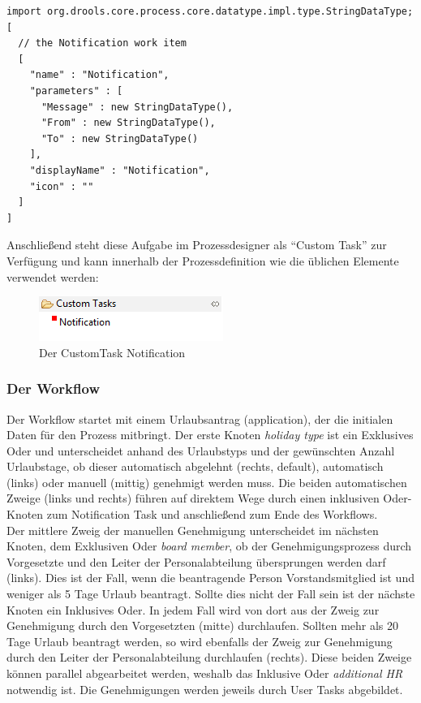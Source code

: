 \begin{lstlisting}
import org.drools.core.process.core.datatype.impl.type.StringDataType;
[
  // the Notification work item
  [
    "name" : "Notification",
    "parameters" : [
      "Message" : new StringDataType(),
      "From" : new StringDataType(),
      "To" : new StringDataType()
    ],
    "displayName" : "Notification",
    "icon" : ""
  ]
]
\end{lstlisting}

Anschließend steht diese Aufgabe im Prozessdesigner als "`Custom Task"' zur Verfügung und kann innerhalb der Prozessdefinition wie die üblichen Elemente verwendet werden:

\begin{figure}[H]
\centering
\includegraphics[width=0.4\linewidth]{Bilder/NotificationCustomTask}
\caption{Der CustomTask Notification}
\label{fig:NotificationCustomTask}
\end{figure}


\subsubsection{Der Workflow}
Der Workflow startet mit einem Urlaubsantrag (application), der die initialen Daten für den Prozess mitbringt. Der erste Knoten \textit{holiday type} ist ein Exklusives Oder und unterscheidet anhand des Urlaubstyps und der gewünschten Anzahl Urlaubstage, ob dieser automatisch abgelehnt (rechts, default), automatisch (links) oder manuell (mittig) genehmigt werden muss. Die beiden automatischen Zweige (links und rechts) führen auf direktem Wege durch einen inklusiven Oder-Knoten zum Notification Task und anschließend zum Ende des Workflows.\\
Der mittlere Zweig der manuellen Genehmigung unterscheidet im nächsten Knoten, dem Exklusiven Oder \textit{board member}, ob der Genehmigungsprozess durch Vorgesetzte und den Leiter der Personalabteilung übersprungen werden darf (links). Dies ist der Fall, wenn die beantragende Person Vorstandsmitglied ist und weniger als 5 Tage Urlaub beantragt. Sollte dies nicht der Fall sein ist der nächste Knoten ein Inklusives Oder. In jedem Fall wird von dort aus der Zweig zur Genehmigung durch den Vorgesetzten (mitte) durchlaufen. Sollten mehr als 20 Tage Urlaub beantragt werden, so wird ebenfalls der Zweig zur Genehmigung durch den Leiter der Personalabteilung durchlaufen (rechts). Diese beiden Zweige können parallel abgearbeitet werden, weshalb das Inklusive Oder \textit{additional HR} notwendig ist. Die Genehmigungen werden jeweils durch User Tasks abgebildet.

